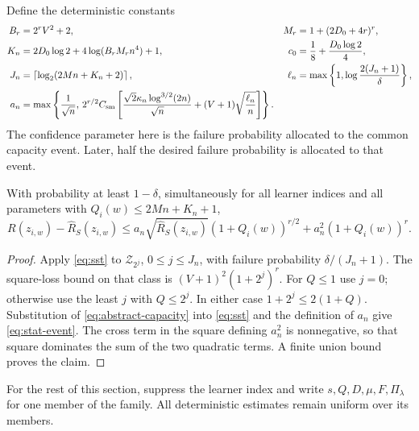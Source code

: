 Define the deterministic constants
\begin{align}
 B_r&=2^rV^2+2,&M_r&=1+(2D_0+4r)^r,\notag\\
 K_n&=2D_0\log2+4\log(B_rM_rn^4)+1,&
 c_0&=\frac18+\frac{D_0\log2}{4},\label{eq:tail-constants}\\
 J_n&=\left\lceil\log_2(2Mn+K_n+2)\right\rceil,&
 \ell_n&=\max\left\{1,\log\frac{2(J_n+1)}\delta\right\},\notag\\
 a_n&=\max\left\{\frac1{\sqrt n},\,
 2^{r/2}C_{\rm sm}\left[
 \frac{\sqrt2\kappa_n\log^{3/2}(2n)}{\sqrt n}
 +(V+1)\sqrt{\frac{\ell_n}n}\right]\right\}.\label{eq:an}
\end{align}
The confidence parameter here is the failure probability allocated to the common capacity event. Later, half the desired failure probability is allocated to that event.

\begin{lemma}
\label{lem:stat-event}
With probability at least $1-\delta$, simultaneously for all learner indices and all parameters with $Q_i(w)\le2Mn+K_n+1$,
\begin{equation}
 R(z_{i,w})-\widehat R_S(z_{i,w})
 \le a_n\sqrt{\widehat R_S(z_{i,w})}(1+Q_i(w))^{r/2}
       +a_n^2(1+Q_i(w))^r.
 \label{eq:stat-event}
\end{equation}
\end{lemma}
\begin{proof}
Apply \eqref{eq:sst} to $\mathcal Z_{2^j}$, $0\le j\le J_n$, with failure probability $\delta/(J_n+1)$. The square-loss bound on that class is $(V+1)^2(1+2^j)^r$. For $Q\le1$ use $j=0$; otherwise use the least $j$ with $Q\le2^j$. In either case $1+2^j\le2(1+Q)$. Substitution of \eqref{eq:abstract-capacity} into \eqref{eq:sst} and the definition of $a_n$ give \eqref{eq:stat-event}. The cross term in the square defining $a_n^2$ is nonnegative, so that square dominates the sum of the two quadratic terms. A finite union bound proves the claim.
\end{proof}

For the rest of this section, suppress the learner index and write $s,Q,D,\mu,F,\Pi_\lambda$ for one member of the family. All deterministic estimates remain uniform over its members.

